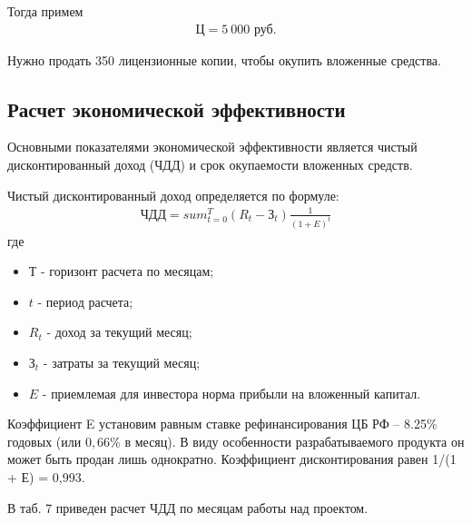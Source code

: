 \documentclass[a4paper,12pt]{report}
\numberwithin{equation}{section}
\begin{document}
Тогда примем
\begin{gather*}
  Ц = 5~000 \text { руб.}
\end{gather*}

Нужно продать 350 лицензионные копии, чтобы окупить вложенные средства.

\subsection{Расчет экономической эффективности}

Основными показателями экономической эффективности является
чистый дисконтированный доход (ЧДД) и срок окупаемости вложенных
средств.

Чистый дисконтированный доход определяется по формуле:
\begin{gather*}
  ЧДД = sum_{t=0}^T (R_t - З_t) \frac{1}{(1 + E)^t}
\end{gather*}
где
\begin{itemize}
  \item $Т$ - горизонт расчета по месяцам;
  \item $t$ - период расчета;
  \item $R_t$ - доход за текущий месяц;
  \item $З_t$ - затраты за текущий месяц;
  \item $E$ - приемлемая для инвестора норма прибыли на вложенный капитал.
\end{itemize}

Коэффициент E установим равным ставке рефинансирования ЦБ РФ – 8.25\%
годовых (или $0,66\%$ в месяц). В виду особенности разрабатываемого продукта
он может быть продан лишь однократно.
Коэффициент дисконтирования равен 1/(1 + Е) = 0,993.

В таб. 7 %
приведен расчет ЧДД по месяцам работы над проектом.
\end{document}
